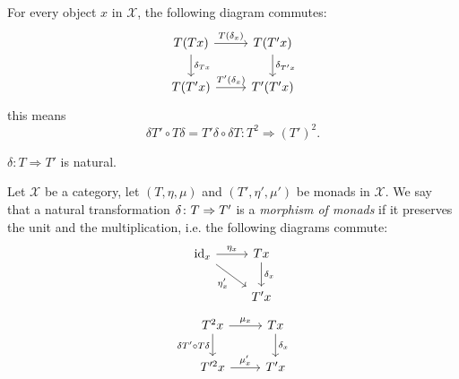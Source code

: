 \begin{lemma}
    For every object $x$ in $\mathcal{X}$, the following diagram commutes:
    \[
      \begin{tikzcd}
        T(Tx) \arrow[r,"T(\delta_x)"] \arrow[d,"\delta_{Tx}"] 
            & T(T'x) \arrow[d,"\delta_{T'x}"] \\
          T(T'x) \arrow[r,"T'(\delta_x)"]
            & T'(T'x)
      \end{tikzcd}
    \]
    this means \[
        \delta T' \circ T \delta = T' \delta \circ \delta T
        \colon T^2 \Rightarrow (T')^2.
    \]
\end{lemma}
\begin{beweis}
    $\delta \colon T \Rightarrow T'$ is natural.
\end{beweis}
\begin{definition}
    Let $\mathcal{X}$ be a category, let $(T,\eta,\mu)$ and $(T',\eta',\mu')$ be monads in $\mathcal{X}$.
    We say that a natural transformation $\nat[\delta]{T}{T'}$ is a \textit{morphism of monads} if it preserves
    the unit and the multiplication, i.e. the following diagrams commute:
    \[\begin{tikzcd}
        \id_x \ar[rd,"\eta'_x"'] \ar[r, "\eta_x"] & Tx \ar[d,"\delta_x"] \\
                                    & T'x
    \end{tikzcd}
        \]
    \[\begin{tikzcd}
        T^2x \ar[r,"\mu_x"] \ar[d,"\delta T' \circ T\delta"'] 
          & Tx \ar[d,"\delta_x"] \\
        T'^2x \ar[r,"\mu'_x"]
          & T'x
    \end{tikzcd}
    \vadjust{\todo{show that the other composition is the same(siehe iPad)}} 
    \]   
\end{definition}
\begin{definition}
\end{definition}